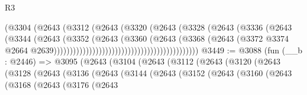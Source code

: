 \begin{lexlean}{R3}
\begin{coremodule}
                                                        (@3304
                                                          (@2643
                                                            (@3312
                                                              (@2643
                                                                (@3320
                                                                  (@2643
                                                                    (@3328
                                                                      (@2643
                                                                        (@3336
                                                                          (@2643
                                                                            (@3344
                                                                              (@2643
                                                                                (@3352
                                                                                  (@2643
                                                                                    (@3360
                                                                                      (@2643
                                                                                        (@3368
                                                                                          (@2643
                                                                                            (@3372
                                                                                              @3374
                                                                                              @2664
                                                                                              @2639)))))))))))))))))))))))))))))))))))))))))))))
@3449 := @3088
    (fun (__b : @2446) =>
    @3095
      (@2643
        (@3104
          (@2643
            (@3112
              (@2643
                (@3120
                  (@2643
                    (@3128
                      (@2643
                        (@3136
                          (@2643
                            (@3144
                              (@2643
                                (@3152
                                  (@2643
                                    (@3160
                                      (@2643
                                        (@3168
                                          (@2643
                                            (@3176
                                              (@2643

\end{coremodule}
\end{lexlean}
